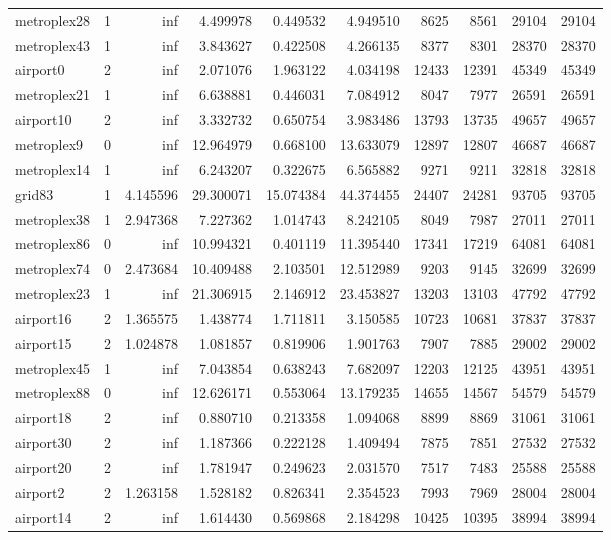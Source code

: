 \begin{longtable}{|l|r|r|r|r|r|r|r|r|r|}
metroplex28 & 1 & inf & 4.499978 & 0.449532 & 4.949510 & 8625 & 8561 & 29104 & 29104 \\
metroplex43 & 1 & inf & 3.843627 & 0.422508 & 4.266135 & 8377 & 8301 & 28370 & 28370 \\
airport0 & 2 & inf & 2.071076 & 1.963122 & 4.034198 & 12433 & 12391 & 45349 & 45349 \\
metroplex21 & 1 & inf & 6.638881 & 0.446031 & 7.084912 & 8047 & 7977 & 26591 & 26591 \\
airport10 & 2 & inf & 3.332732 & 0.650754 & 3.983486 & 13793 & 13735 & 49657 & 49657 \\
metroplex9 & 0 & inf & 12.964979 & 0.668100 & 13.633079 & 12897 & 12807 & 46687 & 46687 \\
metroplex14 & 1 & inf & 6.243207 & 0.322675 & 6.565882 & 9271 & 9211 & 32818 & 32818 \\
grid83 & 1 & 4.145596 & 29.300071 & 15.074384 & 44.374455 & 24407 & 24281 & 93705 & 93705 \\
metroplex38 & 1 & 2.947368 & 7.227362 & 1.014743 & 8.242105 & 8049 & 7987 & 27011 & 27011 \\
metroplex86 & 0 & inf & 10.994321 & 0.401119 & 11.395440 & 17341 & 17219 & 64081 & 64081 \\
metroplex74 & 0 & 2.473684 & 10.409488 & 2.103501 & 12.512989 & 9203 & 9145 & 32699 & 32699 \\
metroplex23 & 1 & inf & 21.306915 & 2.146912 & 23.453827 & 13203 & 13103 & 47792 & 47792 \\
airport16 & 2 & 1.365575 & 1.438774 & 1.711811 & 3.150585 & 10723 & 10681 & 37837 & 37837 \\
airport15 & 2 & 1.024878 & 1.081857 & 0.819906 & 1.901763 & 7907 & 7885 & 29002 & 29002 \\
metroplex45 & 1 & inf & 7.043854 & 0.638243 & 7.682097 & 12203 & 12125 & 43951 & 43951 \\
metroplex88 & 0 & inf & 12.626171 & 0.553064 & 13.179235 & 14655 & 14567 & 54579 & 54579 \\
airport18 & 2 & inf & 0.880710 & 0.213358 & 1.094068 & 8899 & 8869 & 31061 & 31061 \\
airport30 & 2 & inf & 1.187366 & 0.222128 & 1.409494 & 7875 & 7851 & 27532 & 27532 \\
airport20 & 2 & inf & 1.781947 & 0.249623 & 2.031570 & 7517 & 7483 & 25588 & 25588 \\
airport2 & 2 & 1.263158 & 1.528182 & 0.826341 & 2.354523 & 7993 & 7969 & 28004 & 28004 \\
airport14 & 2 & inf & 1.614430 & 0.569868 & 2.184298 & 10425 & 10395 & 38994 & 38994 \\

\end{longtable}
